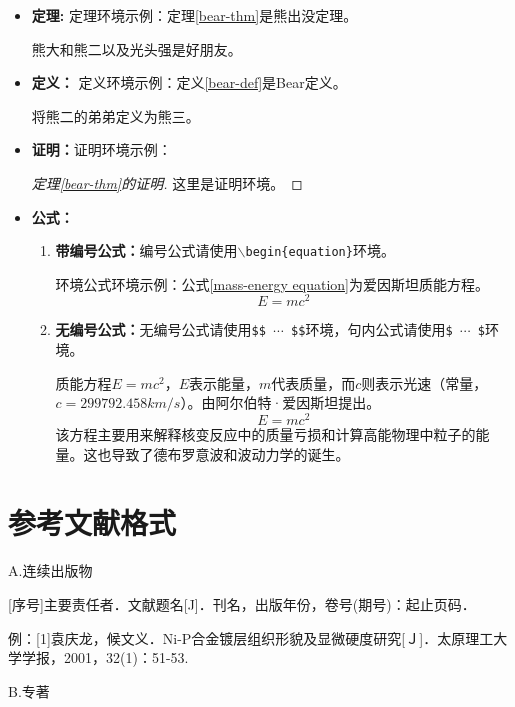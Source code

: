 	\begin{itemize}
		\item \textbf{定理:} 定理环境示例：定理\ref{bear-thm}是熊出没定理。
		\begin{theorem}[熊出没定理]\label{bear-thm}
			熊大和熊二以及光头强是好朋友。
		\end{theorem}
		\item \textbf{定义：} 定义环境示例：定义\ref{bear-def}是Bear定义。
		\begin{definition}[Bear定义]\label{bear-def}
			将熊二的弟弟定义为熊三。
		\end{definition}
		\item \textbf{证明：}证明环境示例：
		\begin{proof}[定理\ref{bear-thm}的证明]
			这里是证明环境。
		\end{proof}
		\item \textbf{公式：}
		\begin{enumerate}
			\item \textbf{带编号公式：}编号公式请使用\texttt{$\backslash$begin\{equation\}}环境。
			
			环境公式环境示例：公式\ref{mass-energy equation}为爱因斯坦质能方程。
			\begin{equation}\label{mass-energy equation}
			E=mc^{2}
			\end{equation}
		
			\item \textbf{无编号公式：}无编号公式请使用\texttt{\$\$ $\cdots$ \$\$}环境，句内公式请使用\texttt{\$ $\cdots$ \$}环境。
			
			质能方程$E=mc^{2}$，$E$表示能量，$m$代表质量，而$c$则表示光速（常量，$c=299792.458km/s$）。由阿尔伯特·爱因斯坦提出。$$E=mc^{2}$$该方程主要用来解释核变反应中的质量亏损和计算高能物理中粒子的能量。这也导致了德布罗意波和波动力学的诞生。
		\end{enumerate}
	\end{itemize}

\section{参考文献格式}

\noindent A.连续出版物

	[序号]主要责任者．文献题名[J]．刊名，出版年份，卷号(期号)：起止页码．

	例：[1]袁庆龙，候文义．Ni-P合金镀层组织形貌及显微硬度研究[Ｊ]．太原理工大学学报，2001，32(1)：51-53.

\noindent B.专著

